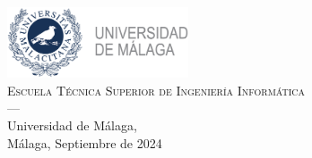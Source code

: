 \begin{titlepage}
\begin{minipage}{\textwidth}
\vspace{0.7cm}
\includegraphics[width=0.4\textwidth]{logos/MARCA UNIV. POSITIVA HORIZONTAL.png}\\[0.1cm]

\textsc{Escuela Técnica Superior de Ingeniería Informática}\\
\textsc{---}\\
Universidad de Málaga,\\
Málaga, Septiembre de 2024

\end{minipage}

\end{titlepage}